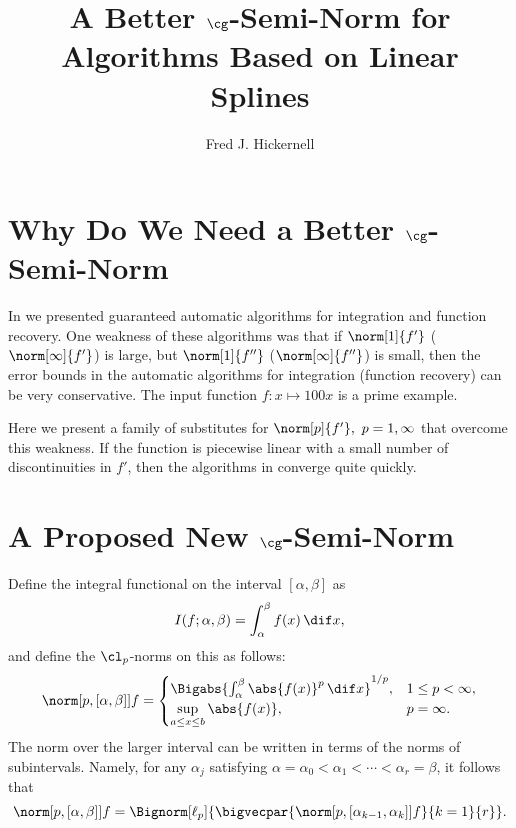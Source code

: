 \documentclass[final]{elsarticle}
\theoremstyle{definition}
\theoremstyle{remark}
\begin{document}
\begin{frontmatter}

\title{A Better $\cg$-Semi-Norm for Algorithms Based on Linear Splines}
\author{Fred J. Hickernell}
\address{Room E1-208, Department of Applied Mathematics, Illinois Institute of Technology,\\ 10 W.\ 32$^{\text{nd}}$ St., Chicago, IL 60616}
\begin{abstract}
\end{abstract}

\begin{keyword}


\end{keyword}
\end{frontmatter}

\section{Why Do We Need a Better $\cg$-Semi-Norm}
In \cite{HicEtal14b} we presented guaranteed automatic algorithms for integration and function recovery.  One weakness of these algorithms was that if $\norm[1]{f'}$ ($\norm[\infty]{f'}$) is large, but $\norm[1]{f''}$ ($\norm[\infty]{f''}$) is small, then the error bounds in the automatic algorithms for integration (function recovery) can be very conservative.  The input function $f:x\mapsto 100 x$ is a prime example.

Here we present a family of substitutes for $\norm[p]{f'}, \ p=1,\infty$ that overcome this weakness.  If the function is piecewise linear with a small number of discontinuities in $f'$, then the algorithms in \cite{HicEtal14b} converge quite quickly.

\section{A Proposed New $\cg$-Semi-Norm}
Define the integral functional on the interval $[\alpha,\beta]$ as 
\[
I(f;\alpha,\beta) = \int_\alpha^\beta f(x) \, \dif x,
\]
and define the $\cl_p$-norms on this as follows:
\[
\norm[p,{[\alpha,\beta]}]{f} = \begin{cases} \Bigabs{\int_\alpha^\beta \abs{f(x)}^p \, \dif x}^{1/p}, & 1 \le p < \infty,\\
\displaystyle \sup_{a \le x \le b}\abs{f(x)}, & p=\infty.
\end{cases}
\]
The norm over the larger interval can be written in terms of the norms of subintervals.  Namely, for any $\alpha_j$ satisfying $\alpha=\alpha_0 < \alpha_1 < \cdots < \alpha_r=\beta$, it follows that
\begin{equation}\label{subintnorm}
\norm[p,{[\alpha,\beta]}]{f} = \Bignorm[\ell_p]{\bigvecpar{\norm[p,{[\alpha_{k-1},\alpha_k]}]{f}}{k=1}{r}}.
\end{equation}
\end{document}

